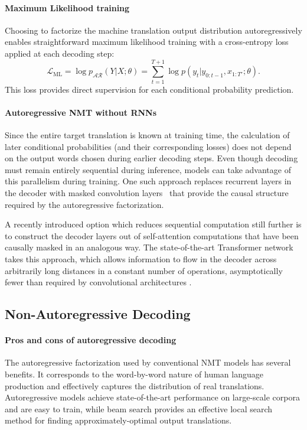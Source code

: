 \vspace{-5pt}
\paragraph{Maximum Likelihood training}
Choosing to factorize the machine translation output distribution autoregressively enables straightforward maximum likelihood training with a cross-entropy loss applied at each decoding step:
\begin{equation}
\mathcal{L}_{\text{ML}} = \log p_{\mathcal{AR}}(Y|X; \theta) = \sum_{t=1}^{T+1}\log p(y_t|y_{0:t-1},x_{1:T'};\theta).
\end{equation}
This loss provides direct supervision for each conditional probability prediction.

\vspace{-5pt}
\paragraph{Autoregressive NMT without RNNs}
Since the entire target translation is known at training time, the calculation of later conditional probabilities (and their corresponding losses) does not depend on the output words chosen during earlier decoding steps. Even though decoding must remain entirely sequential during inference, models can take advantage of this parallelism during training.
One such approach replaces recurrent layers in the decoder with masked convolution layers~\citep{kalchbrenner2016neural, gehring2017convolutional} that provide the causal structure required by the autoregressive factorization.

A recently introduced option which reduces sequential computation still further is to construct the decoder layers out of self-attention computations that have been causally masked in an analogous way.
The state-of-the-art Transformer network takes this approach, which allows information to flow in the decoder across arbitrarily long distances in a constant number of operations, asymptotically fewer than required by convolutional architectures \citep{vaswani2017attention}.

\subsection{Non-Autoregressive Decoding}
\vspace{-5pt}
\paragraph{Pros and cons of autoregressive decoding}
The autoregressive factorization used by conventional NMT models has several benefits. It corresponds to the word-by-word nature of human language production and effectively captures the distribution of real translations. Autoregressive models achieve state-of-the-art performance on large-scale corpora and are easy to train, while beam search provides an effective local search method for finding approximately-optimal output translations.


